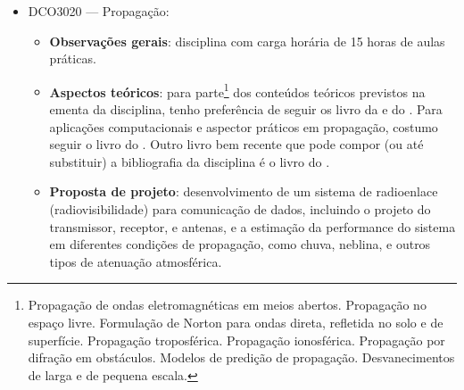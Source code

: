 \documentclass{article}
\begin{document}
\begin{itemize}
\begin{itemize}
        \item \textbf{Ferramentas de apoio}: para a execução das atividades práticas, recomenda-se o uso de ferramentas de simulação de circuitos analógicos e de radiofrequência. O LTspice pode ser adotado como ferramenta principal para análise de circuitos no domínio do tempo e da frequência, permitindo estudar filtros, circuitos ressonantes, casamento de impedância, amplificadores, osciladores, detectores e circuitos de modulação. Como ferramenta complementar, pode-se utilizar o Qucs-S, especialmente em atividades envolvendo redes de duas portas, parâmetros S e análise de circuitos em radiofrequência. Dessa forma, os alunos podem relacionar os conceitos teóricos de circuitos para comunicações com a simulação de blocos fundamentais presentes em transmissores, receptores e transceptores de RF.
    \end{itemize}
    \item DCO3020 --- Propagação:
    \begin{itemize}
        \item \textbf{Observações gerais}: disciplina com carga horária de 15 horas de aulas práticas.
        \item \textbf{Aspectos teóricos}: para parte\footnote{Propagação de ondas eletromagnéticas em meios abertos. Propagação no espaço livre. Formulação de Norton para ondas direta, refletida no solo e de superfície. Propagação troposférica. Propagação ionosférica. Propagação por difração em obstáculos. Modelos de predição de propagação. Desvanecimentos de larga e de pequena escala.} dos conteúdos teóricos previstos na ementa da disciplina, tenho preferência de seguir os livro da \textcite{goldsmithWirelessCommunications2005} e do \textcite{rappaportWirelessCommunicationsPrinciples2001}. Para aplicações computacionais e aspector práticos em propagação, costumo seguir o livro do \textcite{sanchesProjetosSistemasRadio2008}. Outro livro bem recente que pode compor (ou até substituir) a bibliografia da disciplina é o livro do \textcite{filhoEngenhariaRadioenlacesArquitetura2025}.
        \item \textbf{Proposta de projeto}: desenvolvimento de um sistema de radioenlace  (radiovisibilidade) para comunicação de dados, incluindo o projeto do transmissor, receptor, e antenas, e a estimação da performance do sistema em diferentes condições de propagação, como chuva, neblina, e outros tipos de atenuação atmosférica.

\end{itemize}
\end{itemize}
\end{document}
